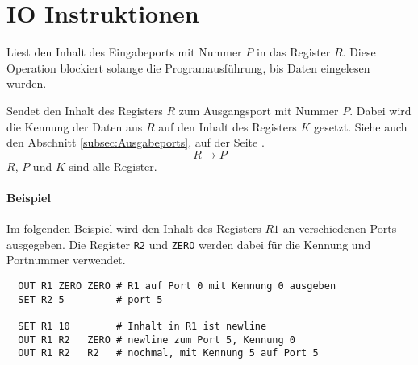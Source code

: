 \section{IO Instruktionen}
\label{sec:IO-Instruktionen}




Liest den Inhalt des Eingabeports mit Nummer $P$ in das Register $R$.
Diese Operation blockiert solange die Programausführung, bis Daten eingelesen
wurden.







Sendet den Inhalt des Registers $R$ zum Ausgangsport mit Nummer $P$. Dabei wird
die Kennung der Daten aus $R$ auf den Inhalt des Registers $K$ gesetzt.
Siehe auch den Abschnitt \ref{subsec:Ausgabeports}, auf der Seite
\pageref{subsec:Ausgabeports}.
\[
    R \to P
\]
$R$, $P$ und $K$ sind alle Register.

\paragraph{Beispiel}
Im folgenden Beispiel wird den Inhalt des Registers $R1$ an verschiedenen Ports
ausgegeben. Die Register \texttt{R2} und \texttt{ZERO} werden dabei für die
Kennung und Portnummer verwendet.

\begin{lstlisting}
  OUT R1 ZERO ZERO # R1 auf Port 0 mit Kennung 0 ausgeben
  SET R2 5         # port 5

  SET R1 10        # Inhalt in R1 ist newline
  OUT R1 R2   ZERO # newline zum Port 5, Kennung 0
  OUT R1 R2   R2   # nochmal, mit Kennung 5 auf Port 5
\end{lstlisting}

